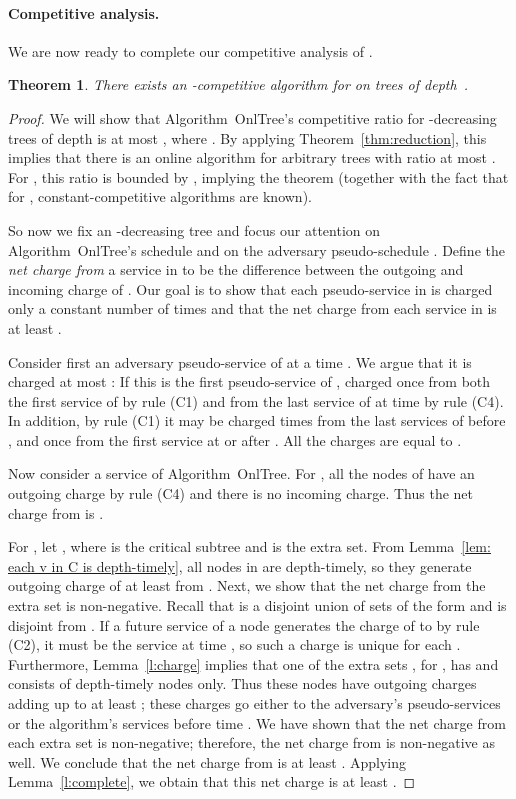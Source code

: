 \documentclass[a4paper]{article}
\newtheorem{theorem}{Theorem}[section]
\newcommand{\OnAlgTreesGeneral}{{\sc OnlTree}}
\begin{document}
\paragraph{Competitive analysis.} 

We are now ready to complete our competitive analysis of .

\begin{theorem}\label{thm: general mlap competitive}
There exists an -competitive algorithm for  on 
trees of depth~.
\end{theorem}

\begin{proof}
We will show that Algorithm~{\OnAlgTreesGeneral}'s competitive ratio
for -decreasing trees of depth 
is at most , where . 
By applying Theorem~\ref{thm:reduction}, this implies that
there is an online algorithm for arbitrary trees with ratio
at most . For , this
ratio is bounded by , implying the theorem (together with the
fact that for , constant-competitive algorithms are known).

So now we fix an -decreasing tree  and focus our attention
on Algorithm~{\OnAlgTreesGeneral}'s schedule  and on the
adversary pseudo-schedule . Define the \emph{net charge
  from} a service  in  to be the difference between
the outgoing and incoming charge of .  Our goal is to show that
each pseudo-service in  is charged only a constant
number of times and that the net charge from each service  in
 is at least .

Consider first an adversary pseudo-service of  at a time . We
argue that it is charged at most : If this is the
first pseudo-service of , charged once from both the first service
of  by rule (C1) and from the last service of  at time  by
rule (C4). In addition, by rule (C1) it may be charged  times from
the last  services of  before , and once from the first
service at or after . All the charges are equal to .

Now consider a service  of Algorithm~{\OnAlgTreesGeneral}. For
, all the nodes of  have an outgoing charge by rule (C4)
and there is no incoming charge. Thus the net charge from  is
.

For , let , where  is the critical subtree and 
is the extra set. From Lemma~\ref{lem: each v in C is depth-timely},
all nodes in  are depth-timely, so they generate outgoing charge of
at least  from .  Next, we show that the net charge
from the extra set  is non-negative.  Recall that  is a disjoint
union of sets of the form  and  is disjoint from .  If
a future service of a node  generates the charge of 
to  by rule (C2), it must be the service at time ,
so such a charge is unique for each .  Furthermore,
Lemma~\ref{l:charge} implies that one of the extra sets ,
for , has  and consists of
depth-timely nodes only. Thus these nodes have outgoing charges adding
up to at least ; these charges go either to the adversary's
pseudo-services or the algorithm's services before time .  We have
shown that the net charge from each extra set  is
non-negative; therefore, the net charge from  is non-negative as
well.  We conclude that the net charge from  is at least
. Applying Lemma~\ref{l:complete}, we obtain that this net
charge is at least .


\end{proof}
\end{document}

